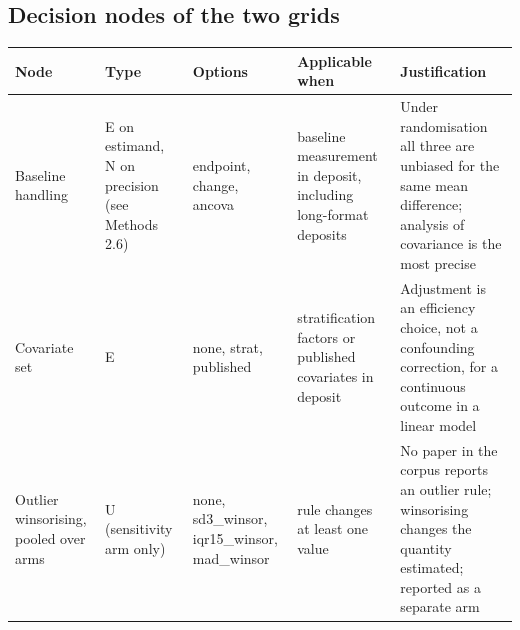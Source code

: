 \subsection{Decision nodes of the two grids}\label{decision-nodes-of-the-two-grids}

{\def\LTcaptype{none} %
\begin{longtable}[]{@{}
  >{\raggedright\arraybackslash}p{}
  >{\raggedright\arraybackslash}p{}
  >{\raggedright\arraybackslash}p{}
  >{\raggedright\arraybackslash}p{}
  >{\raggedright\arraybackslash}p{}@{}}
\toprule\noalign{}
\begin{minipage}[b]{\linewidth}\raggedright
Node
\end{minipage} & \begin{minipage}[b]{\linewidth}\raggedright
Type
\end{minipage} & \begin{minipage}[b]{\linewidth}\raggedright
Options
\end{minipage} & \begin{minipage}[b]{\linewidth}\raggedright
Applicable when
\end{minipage} & \begin{minipage}[b]{\linewidth}\raggedright
Justification
\end{minipage} \\
\midrule\noalign{}
\endhead
\bottomrule\noalign{}
\endlastfoot
Baseline handling & E on estimand, N on precision (see Methods 2.6) & endpoint, change, ancova & baseline measurement in deposit, including long-format deposits & Under randomisation all three are unbiased for the same mean difference; analysis of covariance is the most precise \cite{Vickers_2001,Senn_2006,Van_Breukelen_2006} \\
Covariate set & E & none, strat, published & stratification factors or published covariates in deposit & Adjustment is an efficiency choice, not a confounding correction, for a continuous outcome in a linear model \cite{Kahan_2014,Kahan_2012} \\
Outlier winsorising, pooled over arms & U (sensitivity arm only) & none, sd3\_winsor, iqr15\_winsor, mad\_winsor & rule changes at least one value & No paper in the corpus reports an outlier rule; winsorising changes the quantity estimated; reported as a separate arm \\

\end{longtable}}
